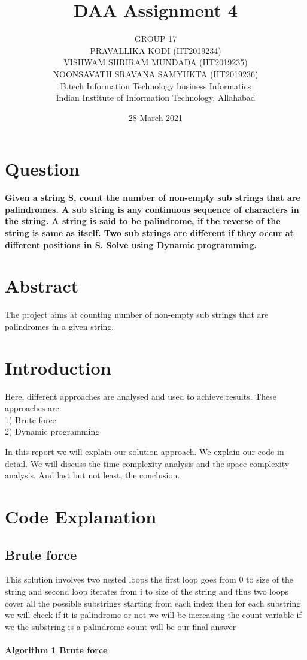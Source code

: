 \documentclass[12pt, a4paper]{report}
\title{DAA Assignment 4}
\author{GROUP 17\\
PRAVALLIKA KODI
 (IIT2019234)\\ 
VISHWAM SHRIRAM MUNDADA
 (IIT2019235)\\ 
NOONSAVATH SRAVANA SAMYUKTA
 (IIT2019236)\\
B.tech Information Technology business Informatics\\
Indian Institute of Information Technology, Allahabad}
\date{28 March 2021}
\begin{document}
\maketitle

\begin{multicols}{2}
\section{Question}

\textbf{Given a string S, count the number of non-empty sub strings that are
palindromes. A sub string is any continuous sequence of characters in the
string. A string is said to be palindrome, if the reverse of the string is same
as itself. Two sub strings are different if they occur at different positions in
S. Solve using Dynamic programming.}
\section{Abstract}

The project aims at counting  number of non-empty sub strings that are palindromes in a given string.


\section{Introduction}
Here, different approaches are analysed and used to achieve results.
These approaches are:\\
1) Brute force\\
2) Dynamic programming
 


In this report we will explain our solution approach. We explain our code in detail. We will discuss the time complexity analysis and the space complexity analysis. And last but not least, the conclusion.



\section{Code Explanation}
\subsection{Brute force}

This solution involves two nested loops 
the first loop goes from 0 to size of the string
and second loop iterates from i to size of the string
and thus two loops cover all the possible substrings 
starting from each index
then for each substring we will check if it  is palindrome or not
we will be increasing the count variable if we the substring is a palindrome
count will be our final answer\\
\hline\\
\textbf{Algorithm 1 Brute force}


\end{multicols}
\end{document}
